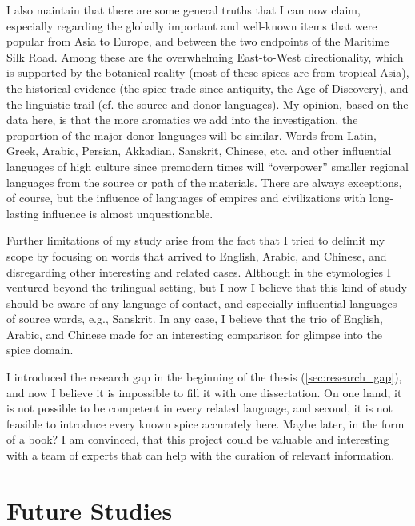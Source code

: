 I also maintain that there are some general truths that I can now claim, especially regarding the globally important and well-known items that were popular from Asia to Europe, and between the two endpoints of the Maritime Silk Road. Among these are the overwhelming East-to-West directionality, which is supported by the botanical reality (most of these spices are from tropical Asia), the historical evidence (the spice trade since antiquity, the Age of Discovery), and the linguistic trail (cf. the source and donor languages). My opinion, based on the data here, is that the more aromatics we add into the investigation, the proportion of the major donor languages will be similar. Words from Latin, Greek, Arabic, Persian, Akkadian, Sanskrit, Chinese, etc. and other influential languages of high culture since premodern times will ``overpower'' smaller regional languages from the source or path of the materials. There are always exceptions, of course, but the influence of languages of empires and civilizations with long-lasting influence is almost unquestionable.

Further limitations of my study arise from the fact that I tried to delimit my scope by focusing on words that arrived to English, Arabic, and Chinese, and disregarding other interesting and related cases. Although in the etymologies I ventured beyond the trilingual setting, but I now I believe that this kind of study should be aware of any language of contact, and especially influential languages of source words, e.g., Sanskrit. In any case, I believe that the trio of English, Arabic, and Chinese made for an interesting comparison for glimpse into the spice domain.


I introduced the research gap in the beginning of the thesis (\cref{sec:research_gap}), and now I believe it is impossible to fill it with one dissertation. On one hand, it is not possible to be competent in every related language, and second, it is not feasible to introduce every known spice accurately here. Maybe later, in the form of a book? I am convinced, that this project could be valuable and interesting with a team of experts that can help with the curation of relevant information.

\section{Future Studies}
\label{sec:future_studies}

